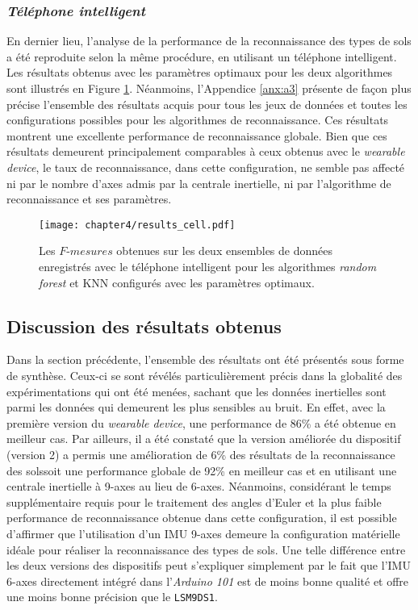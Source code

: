 \subsubsection{\textit{Téléphone intelligent}}

En dernier lieu, l'analyse de la performance de la reconnaissance des types de sols a été reproduite selon la même procédure, en utilisant un téléphone intelligent. Les résultats obtenus avec les paramètres optimaux pour les deux algorithmes sont illustrés en Figure \ref{fig:results_cell}. Néanmoins, l'Appendice \ref{anx:a3} présente de façon plus précise l'ensemble des résultats acquis pour tous les jeux de données et toutes les configurations possibles pour les algorithmes de reconnaissance. Ces résultats montrent une excellente performance de reconnaissance globale. Bien que ces résultats demeurent principalement comparables à ceux obtenus avec le \textit{wearable device}, le taux de reconnaissance, dans cette configuration, ne semble pas affecté ni par le nombre d'axes admis par la centrale inertielle, ni par l'algorithme de reconnaissance et ses paramètres.

\begin{figure}[H]
	\centering
	\texttt{[image: chapter4/results\_cell.pdf]}
        \caption{Les $F\mbox{-} mesures$ obtenues sur les deux ensembles de données enregistrés avec le téléphone intelligent pour les algorithmes \textit{random forest} et \acs{KNN} configurés avec les paramètres optimaux.}
	\label{fig:results_cell}
\end{figure}

\subsection{Discussion des résultats obtenus}

Dans la section précédente, l'ensemble des résultats ont été présentés sous forme de synthèse. Ceux-ci se sont révélés particulièrement précis dans la globalité des expérimentations qui ont été menées, sachant que les données inertielles sont parmi les données qui demeurent les plus sensibles au bruit. En effet, avec la première version du \textit{wearable device}, une performance de 86\% a été obtenue en meilleur cas. Par ailleurs, il a été constaté que la version améliorée du dispositif (version 2) a permis une amélioration de 6\% des résultats de la reconnaissance des sols\textemdash soit une performance globale de 92\% en meilleur cas et en utilisant une centrale inertielle à 9-axes au lieu de 6-axes. Néanmoins, considérant le temps supplémentaire requis pour le traitement des angles d'Euler et la plus faible performance de reconnaissance obtenue dans cette configuration, il est possible d'affirmer que l'utilisation d'un \acs{IMU} 9-axes demeure la configuration matérielle idéale pour réaliser la reconnaissance des types de sols. Une telle différence entre les deux versions des dispositifs peut s'expliquer simplement par le fait que l'\acs{IMU} 6-axes directement intégré dans l'\textit{Arduino 101} est de moins bonne qualité et offre une moins bonne précision que le \texttt{LSM9DS1}.

